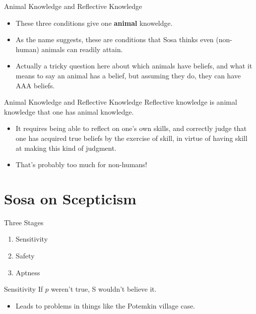 \documentclass[
  17pt,
  letterpaper,
  ignorenonframetext,
  aspectratio=169,
]{beamer}
\providecommand{\tightlist}{%
  \setlength{\itemsep}{0pt}\setlength{\parskip}{0pt}}\usepackage{longtable,booktabs,array}
\begin{document}
\begin{frame}{Animal Knowledge and Reflective Knowledge}
\protect\hypertarget{animal-knowledge-and-reflective-knowledge}{}
\begin{itemize}[<+->]
\tightlist
\item
  These three conditions give one \textbf{animal} knoweldge.
\item
  As the name suggests, these are conditions that Sosa thinks even
  (non-human) animals can readily attain.
\item
  Actually a tricky question here about which animals have beliefs, and
  what it means to say an animal has a belief, but assuming they do,
  they can have AAA beliefs.
\end{itemize}
\end{frame}

\begin{frame}{Animal Knowledge and Reflective Knowledge}
\protect\hypertarget{animal-knowledge-and-reflective-knowledge-1}{}
Reflective knowledge is animal knowledge that one has animal knowledge.

\begin{itemize}[<+->]
\tightlist
\item
  It requires being able to reflect on one's own skills, and correctly
  judge that one has acquired true beliefs by the exercise of skill, in
  virtue of having skill at making this kind of judgment.
\item
  That's probably too much for non-humans!
\end{itemize}
\end{frame}

\hypertarget{sosa-on-scepticism}{%
\section{Sosa on Scepticism}\label{sosa-on-scepticism}}

\begin{frame}{Three Stages}
\protect\hypertarget{three-stages}{}
\begin{enumerate}[<+->]
\tightlist
\item
  Sensitivity
\item
  Safety
\item
  Aptness
\end{enumerate}
\end{frame}

\begin{frame}{Sensitivity}
\protect\hypertarget{sensitivity}{}
If \(p\) weren't true, S wouldn't believe it.

\begin{itemize}[<+->]
\tightlist
\item
  Leads to problems in things like the Potemkin village case.
\end{itemize}
\end{frame}
\end{document}
